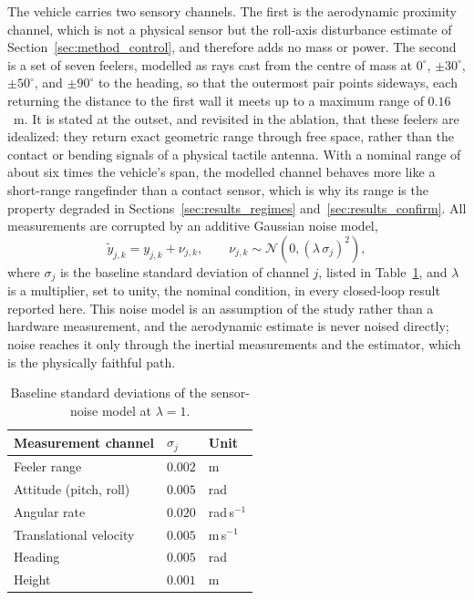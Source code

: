 \documentclass[final,5p,times]{elsarticle}
\begin{document}
The vehicle carries two sensory channels. The first is the aerodynamic proximity channel, which is not a physical sensor but the roll-axis disturbance estimate of Section~\ref{sec:method_control}, and therefore adds no mass or power. The second is a set of seven feelers, modelled as rays cast from the centre of mass at $0^\circ$, $\pm30^\circ$, $\pm50^\circ$, and $\pm90^\circ$ to the heading, so that the outermost pair points sideways, each returning the distance to the first wall it meets up to a maximum range of $0.16$~m. It is stated at the outset, and revisited in the ablation, that these feelers are idealized: they return exact geometric range through free space, rather than the contact or bending signals of a physical tactile antenna. With a nominal range of about six times the vehicle's span, the modelled channel behaves more like a short-range rangefinder than a contact sensor, which is why its range is the property degraded in Sections~\ref{sec:results_regimes} and~\ref{sec:results_confirm}. All measurements are corrupted by an additive Gaussian noise model,
\begin{equation}
    \tilde{y}_{j,k} = y_{j,k} + \nu_{j,k}, \qquad \nu_{j,k} \sim \mathcal{N}\!\left(0, (\lambda\,\sigma_j)^2\right),
    \label{eq:noise}
\end{equation}
where $\sigma_j$ is the baseline standard deviation of channel $j$, listed in Table~\ref{tab:noise}, and $\lambda$ is a multiplier, set to unity, the nominal condition, in every closed-loop result reported here. This noise model is an assumption of the study rather than a hardware measurement, and the aerodynamic estimate is never noised directly; noise reaches it only through the inertial measurements and the estimator, which is the physically faithful path.

\begin{table}[t]
\centering
\caption{Baseline standard deviations of the sensor-noise model at $\lambda = 1$.}
\label{tab:noise}
\footnotesize\setlength{\tabcolsep}{3pt}
\begin{tabular*}{\columnwidth}{@{\extracolsep{\fill}}lll@{}}
\toprule
Measurement channel & $\sigma_j$ & Unit \\
\midrule
Feeler range & $0.002$ & m \\
Attitude (pitch, roll) & $0.005$ & rad \\
Angular rate & $0.020$ & rad\,s$^{-1}$ \\
Translational velocity & $0.005$ & m\,s$^{-1}$ \\
Heading & $0.005$ & rad \\
Height & $0.001$ & m \\
\bottomrule
\end{tabular*}
\end{table}
\end{document}
